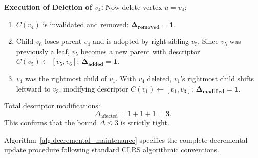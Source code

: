 \textbf{Execution of Deletion of $v_4$:}
Now delete vertex $u = v_4$:
\begin{enumerate}
    \item $C(v_4)$ is invalidated and removed: $\mathbf{\Delta_{\text{removed}} = 1}$.
    \item Child $v_6$ loses parent $v_4$ and is adopted by right sibling $v_5$. Since $v_5$ was previously a leaf, $v_5$ becomes a new parent with descriptor $C(v_5) \leftarrow [v_5, v_6]$: $\mathbf{\Delta_{\text{added}} = 1}$.
    \item $v_4$ was the rightmost child of $v_1$. With $v_4$ deleted, $v_1$'s rightmost child shifts leftward to $v_3$, modifying descriptor $C(v_1) \leftarrow [v_1, v_3]$: $\mathbf{\Delta_{\text{modified}} = 1}$.
\end{enumerate}
Total descriptor modifications:
\begin{equation}
    \Delta_{\text{affected}} = 1 + 1 + 1 = \mathbf{3}.
\end{equation}
This confirms that the bound $\Delta \le 3$ is strictly tight.

Algorithm~\ref{alg:decremental_maintenance} specifies the complete decremental update procedure following standard CLRS algorithmic conventions.

